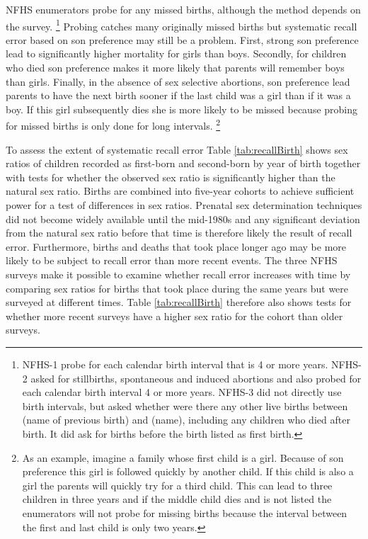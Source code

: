 \documentclass[12pt,letterpaper]{article}
\begin{document}
NFHS enumerators probe for any missed births, although the method depends on the survey.%
\footnote{%
NFHS-1 probe for each calendar birth interval that is 4 or more years.
NFHS-2 asked for stillbirths, spontaneous and induced abortions and also probed 
for each calendar birth interval 4 or more years.
NFHS-3 did not directly use birth intervals, but asked whether were there any other live births 
between (name of previous birth) and (name), including any children who died after birth. 
It did ask for births before the birth listed as first birth.
}
Probing catches many originally missed births but systematic recall error based on son
preference may still be a problem.
First, strong son preference lead to significantly higher mortality for girls than boys.
Secondly, for children who died son preference makes it more likely that parents will
remember boys than girls.
Finally, in the absence of sex selective abortions, son preference lead parents to have 
the next birth sooner if the last child was a girl than if it was a boy.
If this girl subsequently dies she is more likely to be missed because probing for missed 
births is only done for long intervals.%
\footnote{
As an example, imagine a family whose first child is a girl.
Because of son preference this girl is followed quickly by another child.
If this child is also a girl the parents will quickly try for a third child.
This can lead to three children in three years and
if the middle child dies and is not listed the enumerators will not probe for
missing births because the interval between the first and last child is only two years.
}

To assess the extent of systematic recall error Table \ref{tab:recallBirth} 
shows sex ratios of children recorded as first-born and second-born
by year of birth together with tests for whether the observed sex ratio is
significantly higher than the natural sex ratio.
Births are combined into five-year cohorts to achieve sufficient power for a test of 
differences in sex ratios.
Prenatal sex determination techniques did not become widely available until the 
mid-1980s and any significant deviation from the natural sex ratio before that time
is therefore likely the result of recall error.
Furthermore, births and deaths that took place longer ago may be more 
likely to be subject to recall error than more recent events.
The three NFHS surveys make it possible to examine whether recall error increases with 
time by comparing sex ratios for births that took place during the same years but were 
surveyed at different times.
Table \ref{tab:recallBirth} therefore also shows tests for whether more recent surveys 
have a higher sex ratio for the cohort than older surveys.
\end{document}
